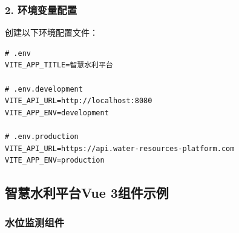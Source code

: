 \subsubsection{2.
环境变量配置}\label{ux73afux5883ux53d8ux91cfux914dux7f6e}

创建以下环境配置文件：

\begin{lstlisting}
# .env
VITE_APP_TITLE=智慧水利平台

# .env.development
VITE_API_URL=http://localhost:8080
VITE_APP_ENV=development

# .env.production
VITE_API_URL=https://api.water-resources-platform.com
VITE_APP_ENV=production
\end{lstlisting}

\subsection{智慧水利平台Vue
3组件示例}\label{ux667aux6167ux6c34ux5229ux5e73ux53f0vue-3ux7ec4ux4ef6ux793aux4f8b}

\subsubsection{水位监测组件}\label{ux6c34ux4f4dux76d1ux6d4bux7ec4ux4ef6}

